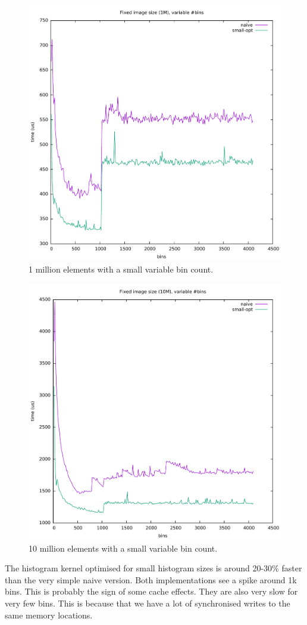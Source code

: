 \documentclass[12pt, a4paper, hidelinks]{article}
\begin{document}
\begin{figure}[htpb]
    \centering
    \includegraphics[width=0.6\linewidth]{img/graphs/1M-smallvarbins.pdf}
    \caption{1 million elements with a small variable bin count.}
    \label{fig:graph3}
\end{figure}
\begin{figure}[htpb]
    \centering
    \includegraphics[width=0.6\linewidth]{img/graphs/10M-smallvarbins.pdf}
    \caption{10 million elements with a small variable bin count.}
    \label{fig:graph4}
\end{figure}

The histogram kernel optimised for small histogram sizes is around
20-30\% faster than the very simple naive version. Both implementations see a spike
around 1k bins.
This is probably the sign of some cache effects. They are also very slow for very few bins.
This is because that we have a lot of synchronised writes to the same memory locations.
\end{document}

